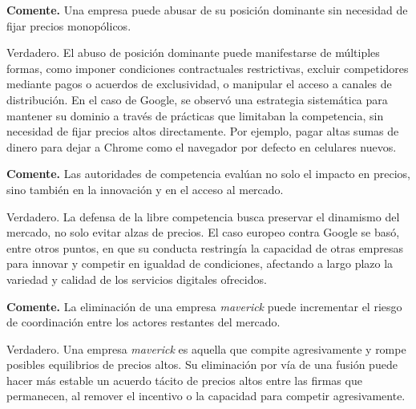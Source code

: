 \question \textbf{Comente.} Una empresa puede abusar de su posición dominante sin necesidad de fijar precios monopólicos.
\begin{solution}
Verdadero. El abuso de posición dominante puede manifestarse de múltiples formas, como imponer condiciones contractuales restrictivas, excluir competidores mediante pagos o acuerdos de exclusividad, o manipular el acceso a canales de distribución. En el caso de Google, se observó una estrategia sistemática para mantener su dominio a través de prácticas que limitaban la competencia, sin necesidad de fijar precios altos directamente. Por ejemplo, pagar altas sumas de dinero para dejar a Chrome como el navegador por defecto en celulares nuevos.

\end{solution}

\question \textbf{Comente.} Las autoridades de competencia evalúan no solo el impacto en precios, sino también en la innovación y en el acceso al mercado.
\begin{solution}
Verdadero. La defensa de la libre competencia busca preservar el dinamismo del mercado, no solo evitar alzas de precios. El caso europeo contra Google se basó, entre otros puntos, en que su conducta restringía la capacidad de otras empresas para innovar y competir en igualdad de condiciones, afectando a largo plazo la variedad y calidad de los servicios digitales ofrecidos.

\end{solution}

\question \textbf{Comente.} La eliminación de una empresa \emph{maverick} puede incrementar el riesgo de coordinación entre los actores restantes del mercado.
\begin{solution}
Verdadero. Una empresa \emph{maverick} es aquella que compite agresivamente y rompe posibles equilibrios de precios altos. Su eliminación por vía de una fusión puede hacer más estable un acuerdo tácito de precios altos entre las firmas que permanecen, al remover el incentivo o la capacidad para competir agresivamente.

\end{solution}

